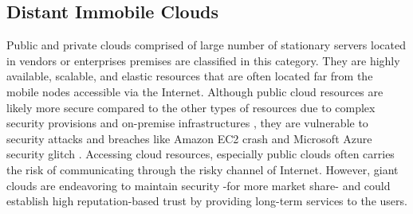 \documentclass[publish]{IEEEtran}
\begin{document}
\subsection{Distant Immobile Clouds}
Public and private clouds comprised of large number of stationary servers located in vendors or enterprises premises are classified in this category. They are highly available, scalable, and elastic resources that are often located far from the mobile nodes accessible via the Internet. Although public cloud resources are likely more secure compared to the other types of resources due to complex security provisions and on-premise infrastructures \cite{PANDA,Kamara2010,wang2009ensuring, mather2009cloud}, they are vulnerable to security attacks and breaches like Amazon EC2 crash \cite{CHRISTIANCACHIN2011} and Microsoft Azure security glitch \cite{microsoftAzureCrash}. Accessing cloud resources, especially public clouds often carries the risk of communicating through the risky channel of Internet. However, giant clouds are endeavoring to maintain security -for more market share- and could establish high reputation-based trust by providing long-term services to the users.
\end{document}
